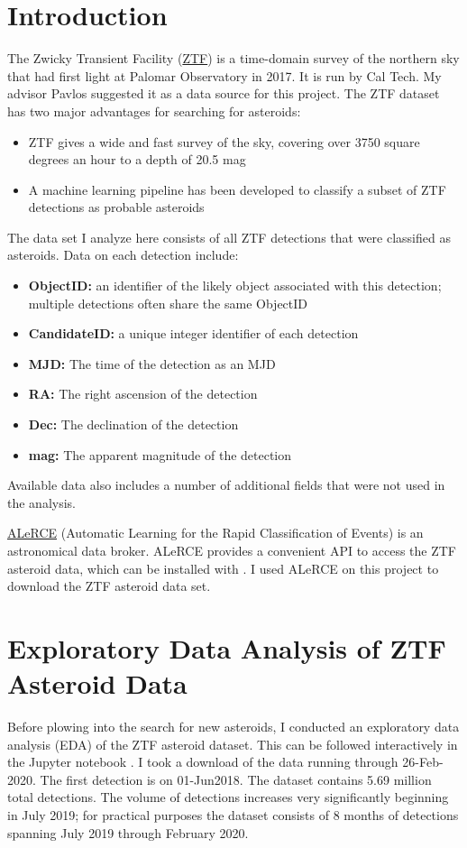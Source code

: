 \section{Introduction}
\label{section_ztf_intro}
The Zwicky Transient Facility (\href{https://www.ztf.caltech.edu/}{ZTF}) is a time-domain survey of the northern sky
that had first light at Palomar Observatory in 2017.  It is run by Cal Tech.
My advisor Pavlos suggested it as a data source for this project.
The ZTF dataset has two major advantages for searching for asteroids:
\begin{itemize}
\item ZTF gives a wide and fast survey of the sky, covering over 3750 square degrees an hour to a depth of 20.5 mag
\item A machine learning pipeline has been developed to classify a subset of ZTF detections as probable asteroids
\end{itemize}
The data set I analyze here consists of all ZTF detections that were classified as asteroids.
Data on each detection include:
\begin{itemize}
\item \textbf{ObjectID:} an identifier of the likely object associated with this detection; multiple detections often share the same ObjectID
\item \textbf{CandidateID:} a unique integer identifier of each detection
\item \textbf{MJD:} The time of the detection as an MJD
\item \textbf{RA:} The right ascension of the detection
\item \textbf{Dec:} The declination of the detection
\item \textbf{mag:} The apparent magnitude of the detection
\end{itemize}
Available data also includes a number of additional fields that were not used in the analysis.

\href{https://github.com/alercebroker}{ALeRCE} (Automatic Learning for the Rapid Classification of Events) is an astronomical data broker.
ALeRCE provides a convenient API to access the ZTF asteroid data, which can be installed with .
I used ALeRCE on this project to download the ZTF asteroid data set.

\section{Exploratory Data Analysis of ZTF Asteroid Data}
\label{section_ztf_eda}
Before plowing into the search for new asteroids, I conducted an exploratory data analysis (EDA) of the ZTF asteroid dataset.
This can be followed interactively in the Jupyter notebook .
I took a download of the data running through 26-Feb-2020.
The first detection is on 01-Jun2018.
The dataset contains 5.69 million total detections.  
The volume of detections increases very significantly beginning in July 2019; 
for practical purposes the dataset consists of 8 months of detections spanning July 2019 through February 2020.

